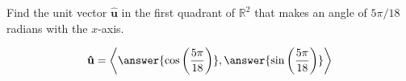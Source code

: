 \documentclass{ximera}
\author{Gregory Hartman \and Matthew Carr}
\begin{document}
\begin{exercise}
Find the unit vector $\mathbf{\hat{u}}$ in the first quadrant of $\mathbb{R}^2$ that
makes an angle of $5\pi/18$ radians with the $x$-axis.
\begin{prompt}
\[
\mathbf{\hat{u}} = \left\langle \answer{\cos\left(\frac{5\pi}{18}\right)},\answer{\sin\left(\frac{5\pi}{18}\right)} \right\rangle
\]
\end{prompt}

\end{exercise}
\end{document}
